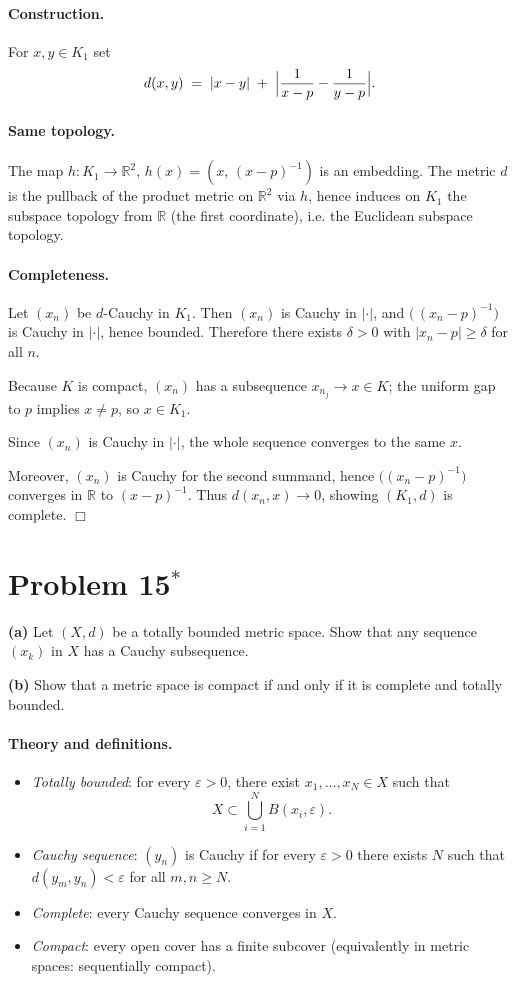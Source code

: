 \documentclass[12pt,a4paper]{article}
\theoremstyle{plain}
\theoremstyle{definition}
\theoremstyle{remark}
\theoremstyle{remark}
\begin{document}
\paragraph{Construction.}
For $x,y\in K_1$ set
\[
d(x,y)\;=\;|x-y|\;+\;\Bigl|\frac{1}{x-p}-\frac{1}{y-p}\Bigr|.
\]

\paragraph{Same topology.}
The map $h:K_1\to\mathbb{R}^2$, $h(x)=(x,\,(x-p)^{-1})$ is an embedding.
The metric $d$ is the pullback of the product metric on $\mathbb{R}^2$ via $h$, hence induces
on $K_1$ the subspace topology from $\mathbb{R}$ (the first coordinate), i.e. the Euclidean subspace topology.

\paragraph{Completeness.}
Let $(x_n)$ be $d$-Cauchy in $K_1$. Then $(x_n)$ is Cauchy in $|\cdot|$, and
$\big(\,(x_n-p)^{-1}\big)$ is Cauchy in $|\cdot|$, hence bounded. Therefore there exists $\delta>0$
with $|x_n-p|\ge \delta$ for all $n$.

Because $K$ is compact, $(x_n)$ has a subsequence $x_{n_j}\to x\in K$; the uniform gap to $p$
implies $x\neq p$, so $x\in K_1$. 

Since $(x_n)$ is Cauchy in $|\cdot|$, the whole sequence
converges to the same $x$.

 Moreover, $(x_n)$ is Cauchy for the second summand, hence
$\bigl((x_n-p)^{-1}\bigr)$ converges in $\mathbb{R}$ to $(x-p)^{-1}$. Thus $d(x_n,x)\to 0$,
showing $(K_1,d)$ is complete. \hfill$\Box$


\section*{Problem 15$^{\ast}$}
\textbf{(a)} Let $(X,d)$ be a totally bounded metric space. Show that any sequence $(x_k)$ in $X$ has a Cauchy subsequence.

\textbf{(b)} Show that a metric space is compact if and only if it is complete and totally bounded.

\bigskip

\paragraph{Theory and definitions.}
\begin{itemize}\setlength{\itemsep}{6pt}
	\item \emph{Totally bounded}: for every $\varepsilon>0$, there exist $x_1,\dots,x_N\in X$ such that
	\[
	X \subset \bigcup_{i=1}^N B(x_i,\varepsilon).
	\]
	\item \emph{Cauchy sequence}: $(y_n)$ is Cauchy if for every $\varepsilon>0$ there exists $N$ such that
	$d(y_m,y_n)<\varepsilon$ for all $m,n\ge N$.
	\item \emph{Complete}: every Cauchy sequence converges in $X$.
	\item \emph{Compact}: every open cover has a finite subcover (equivalently in metric spaces: sequentially compact).
\end{itemize}
\end{document}
